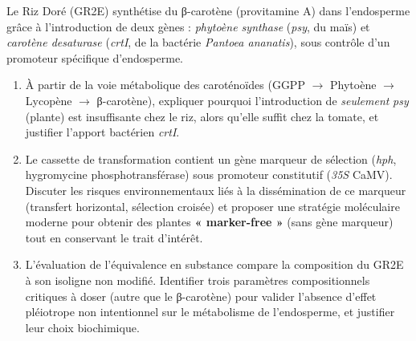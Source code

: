 \documentclass[11pt]{article}
\begin{document}
\begin{exercice}
Le Riz Doré (GR2E) synthétise du β-carotène (provitamine A) dans l'endosperme grâce à l'introduction de deux gènes : \textit{phytoène synthase} (\textit{psy}, du maïs) et \textit{carotène desaturase} (\textit{crtI}, de la bactérie \textit{Pantoea ananatis}), sous contrôle d'un promoteur spécifique d'endosperme.
\begin{enumerate}
    \item À partir de la voie métabolique des caroténoïdes (GGPP $\rightarrow$ Phytoène $\rightarrow$ Lycopène $\rightarrow$ β-carotène), expliquer pourquoi l'introduction de \textit{seulement} \textit{psy} (plante) est insuffisante chez le riz, alors qu'elle suffit chez la tomate, et justifier l'apport bactérien \textit{crtI}.
    \item Le cassette de transformation contient un gène marqueur de sélection (\textit{hph}, hygromycine phosphotransférase) sous promoteur constitutif (\textit{35S} CaMV). Discuter les risques environnementaux liés à la dissémination de ce marqueur (transfert horizontal, sélection croisée) et proposer une stratégie moléculaire moderne pour obtenir des plantes \textbf{« marker-free »} (sans gène marqueur) tout en conservant le trait d'intérêt.
    \item L'évaluation de l'équivalence en substance compare la composition du GR2E à son isoligne non modifié. Identifier trois paramètres compositionnels critiques à doser (autre que le β-carotène) pour valider l'absence d'effet pléiotrope non intentionnel sur le métabolisme de l'endosperme, et justifier leur choix biochimique.
\end{enumerate}
\end{exercice}
\end{document}
